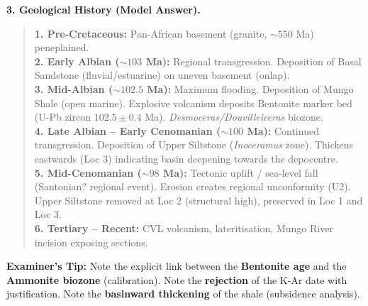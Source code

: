 \documentclass[11pt]{article}
\begin{document}
\begin{exoresolu}
\textbf{3. Geological History (Model Answer).}
\begin{quote}
\textbf{1. Pre-Cretaceous:} Pan-African basement (granite, $\sim 550$ Ma) peneplained. \\
\textbf{2. Early Albian ($\sim 103$ Ma):} Regional transgression. Deposition of Basal Sandstone (fluvial/estuarine) on uneven basement (onlap). \\
\textbf{3. Mid-Albian ($\sim 102.5$ Ma):} Maximum flooding. Deposition of Mungo Shale (open marine). Explosive volcanism deposits Bentonite marker bed (U-Pb zircon $102.5 \pm 0.4$ Ma). \emph{Desmoceras/Douvilleiceras} biozone. \\
\textbf{4. Late Albian -- Early Cenomanian ($\sim 100$ Ma):} Continued transgression. Deposition of Upper Siltstone (\emph{Inoceramus} zone). Thickens eastwards (Loc 3) indicating basin deepening towards the depocentre. \\
\textbf{5. Mid-Cenomanian ($\sim 98$ Ma):} Tectonic uplift / sea-level fall (Santonian? regional event). Erosion creates regional unconformity (U2). Upper Siltstone removed at Loc 2 (structural high), preserved in Loc 1 and Loc 3. \\
\textbf{6. Tertiary -- Recent:} CVL volcanism, lateritisation, Mungo River incision exposing sections.
\end{quote}
\textbf{Examiner's Tip:} Note the explicit link between the \textbf{Bentonite age} and the \textbf{Ammonite biozone} (calibration). Note the \textbf{rejection} of the K-Ar date with justification. Note the \textbf{basinward thickening} of the shale (subsidence analysis).
\end{exoresolu}
\end{document}
